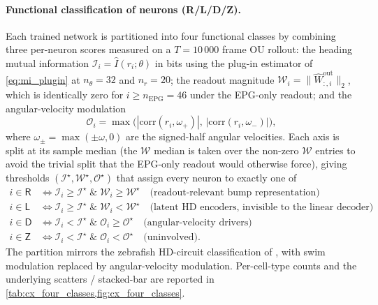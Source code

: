 \documentclass[11pt]{article}
\newcommand{\mi}{\mathcal{I}}
\newcommand{\omag}{\mathcal{W}}
\newcommand{\omod}{\mathcal{O}}
\newcommand{\cls}[1]{\mathsf{#1}}
\begin{document}
\paragraph{Functional classification of neurons (R/L/D/Z).}\label{method:four_classes}
Each trained network is partitioned into four functional classes by
combining three per-neuron scores measured on a $T = 10\,000$ frame
OU rollout: the heading mutual information $\mi_i = \hat I(r_i;
\theta)$ in bits using the plug-in estimator of \cref{eq:mi_plugin}
at $n_\theta = 32$ and $n_r = 20$; the readout magnitude $\omag_i =
\|\hat W^{\mathrm{out}}_{:,i}\|_2$, which is identically zero for
$i \ge n_{\mathrm{EPG}} = 46$ under the EPG-only readout; and the
angular-velocity modulation
\[
  \omod_i = \max\!\big(|\mathrm{corr}(r_i,\omega_+)|,\,
                       |\mathrm{corr}(r_i,\omega_-)|\big),
\]
where $\omega_{\pm} = \max(\pm\omega, 0)$ are the signed-half
angular velocities. Each axis is split at its sample median (the
$\omag$ median is taken over the non-zero $\omag$ entries to avoid
the trivial split that the EPG-only readout would otherwise force),
giving thresholds $(\mi^\star, \omag^\star, \omod^\star)$ that
assign every neuron to exactly one of
\begin{align}
  i \in \cls{R} &\iff \mi_i \ge \mi^\star \;\&\;\omag_i \ge \omag^\star
  \quad\text{(readout-relevant bump representation)} \nonumber\\
  i \in \cls{L} &\iff \mi_i \ge \mi^\star \;\&\;\omag_i < \omag^\star
  \quad\text{(latent HD encoders, invisible to the linear decoder)} \nonumber\\
  i \in \cls{D} &\iff \mi_i < \mi^\star \;\&\;\omod_i \ge \omod^\star
  \quad\text{(angular-velocity drivers)} \nonumber\\
  i \in \cls{Z} &\iff \mi_i < \mi^\star \;\&\;\omod_i < \omod^\star
  \quad\text{(uninvolved)}.
  \label{eq:four_classes}
\end{align}
The partition mirrors the zebrafish HD-circuit classification of
\citet{petrucco2023}, with swim modulation replaced by
angular-velocity modulation. Per-cell-type counts and the underlying
scatters / stacked-bar are reported in \cref{tab:cx_four_classes,fig:cx_four_classes}.
\end{document}
